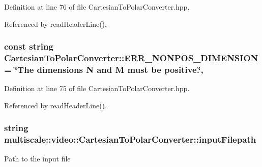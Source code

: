 Definition at line 76 of file Cartesian\-To\-Polar\-Converter.\-hpp.



Referenced by read\-Header\-Line().

\hypertarget{classmultiscale_1_1video_1_1CartesianToPolarConverter_ab3a2114f4dd2615abba3305609f1b616}{
\subsubsection[{E\-R\-R\-\_\-\-N\-O\-N\-P\-O\-S\-\_\-\-D\-I\-M\-E\-N\-S\-I\-O\-N}]{\setlength{\rightskip}{0pt plus 5cm}const string Cartesian\-To\-Polar\-Converter\-::\-E\-R\-R\-\_\-\-N\-O\-N\-P\-O\-S\-\_\-\-D\-I\-M\-E\-N\-S\-I\-O\-N = \char`\"{}The dimensions N and M must be positive.\char`\"{}\hspace{0.3cm}{\ttfamily [static]}, {\ttfamily [private]}}}\label{classmultiscale_1_1video_1_1CartesianToPolarConverter_ab3a2114f4dd2615abba3305609f1b616}


Definition at line 75 of file Cartesian\-To\-Polar\-Converter.\-hpp.



Referenced by read\-Header\-Line().

\hypertarget{classmultiscale_1_1video_1_1CartesianToPolarConverter_aa15eca9e8d3da0eb8ff1b6583e392f05}{
\subsubsection[{input\-Filepath}]{\setlength{\rightskip}{0pt plus 5cm}string multiscale\-::video\-::\-Cartesian\-To\-Polar\-Converter\-::input\-Filepath\hspace{0.3cm}{\ttfamily [private]}}}\label{classmultiscale_1_1video_1_1CartesianToPolarConverter_aa15eca9e8d3da0eb8ff1b6583e392f05}
Path to the input file 


